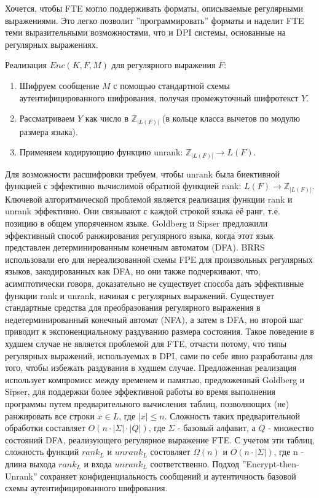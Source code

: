 Хочется, чтобы FTE могло поддерживать форматы, описываемые регулярными выражениями.
Это легко позволит ''программировать'' форматы и наделит FTE теми выразительными возможностями, что и DPI системы, основанные на регулярных выражениях.

Реализация $Enc(K, F, M)$ для регулярного выражения $F$:

\begin{enumerate}
    \item Шифруем сообщение $M$ с помощью стандартной схемы аутентифицированного шифрования, получая промежуточный шифротекст $Y$.
    \item Рассматриваем $Y$ как число в $\mathbb{Z}_{|L(F)|}$ (в кольце класса вычетов по модулю размера языка).
    \item Применяем кодирующию функцию unrank: $\mathbb{Z}_{|L(F)|} \rightarrow L(F)$.
\end{enumerate}



Для возможности расшифровки требуем, чтобы unrank была биективной функцией с эффективно вычислимой обратной функцией rank:  $L(F) \rightarrow \mathbb{Z}_{|L(F)|}$.
Ключевой алгоритмической проблемой является реализация функции rank и unrank эффективно.
Они связывают с каждой строкой языка её ранг, т.е. позицию в общем упоряченном языке.
Goldberg и Sipser предложили эффективный способ ранжирования регулярного языка, когда этот язык представлен детерминированным конечным автоматом (DFA).
BRRS использовали его для нереализованной схемы FPE для произвольных регулярных языков, закодированных как DFA, но они также подчеркивают,
что, асимптотически говоря, доказательно не существует способа дать эффективные функции rank и unrank, начиная с регулярных выражений.
Существует стандартные средства для преобразования регулярного выражения в недетерминированный конечный автомат (NFA),
а затем в DFA, но второй шаг приводит к экспоненциальному раздуванию размера состояния.
Такое поведение в худшем случае не является проблемой для FTE, отчасти потому,
что типы регулярных выражений, используемых в DPI, сами по себе явно разработаны для того, чтобы избежать раздувания в худшем случае.
Предложенная реализация использует компромисс между временем и памятью, предложенный Goldberg и Sipser,
для поддержки более эффективной работы во время выполнения программы путем предварительного вычисления таблиц,
позволяющих (не) ранжировать все строки $x \in L$, где $|x| \leq n$. Сложность таких предварительной обработки составляет $O(n \cdot |\Sigma| \cdot |Q|)$,
где $\Sigma$ - базовый алфавит, а $Q$ - множество состояний DFA, реализующего регулярное выражение FTE.
С учетом эти таблиц, сложность функций $rank_{L}$ и $unrank_{L}$ состовляет $\Omega(n)$ и $O(n \cdot |\Sigma|)$, где n - длина выхода $rank_{L}$ и входа $unrank_{L}$ соответственно.
Подход ''Encrypt-then-Unrank'' сохраняет конфиденциальность сообщений и аутентичность базовой схемы аутентифицированного шифрования.


